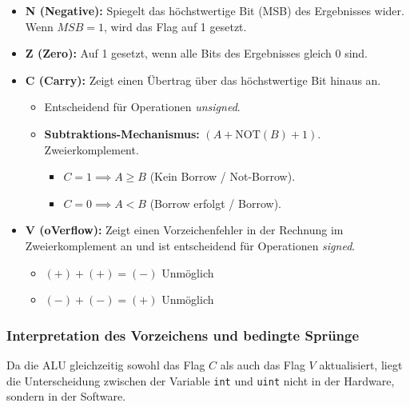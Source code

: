 \begin{itemize}
    \item \textbf{N (Negative):} Spiegelt das höchstwertige Bit (MSB) des Ergebnisses wider. Wenn $MSB=1$, wird das Flag auf 1 gesetzt.
    \item \textbf{Z (Zero):} Auf 1 gesetzt, wenn alle Bits des Ergebnisses gleich 0 sind.
    \item \textbf{C (Carry):} Zeigt einen Übertrag über das höchstwertige Bit hinaus an. 
\begin{itemize}
    \item Entscheidend für Operationen \textit{unsigned}. 
    \item \textbf{Subtraktions-Mechanismus:} $(A + \text{NOT}(B) + 1)$. \quad Zweierkomplement.
\begin{itemize}
        \item $C = 1 \implies A \ge B$ (Kein Borrow / Not-Borrow).
        \item $C = 0 \implies A < B$ (Borrow erfolgt / Borrow).
    \end{itemize}
\end{itemize}
    \item \textbf{V (oVerflow):} Zeigt einen Vorzeichenfehler in der Rechnung im Zweierkomplement an 
    und ist entscheidend für Operationen \textit{signed}.
\begin{itemize}
        \item $(+) + (+) = (-)$ Unmöglich
        \item $(-) + (-) = (+)$ Unmöglich
    \end{itemize}
\end{itemize}

\subsubsection{Interpretation des Vorzeichens und bedingte Sprünge}
\label{subsec:sign_interpretation}

Da die ALU gleichzeitig sowohl das Flag $C$ als auch das Flag $V$ aktualisiert,
liegt die Unterscheidung zwischen der Variable \texttt{int} und \texttt{uint} nicht in der Hardware, 
sondern in der Software.

